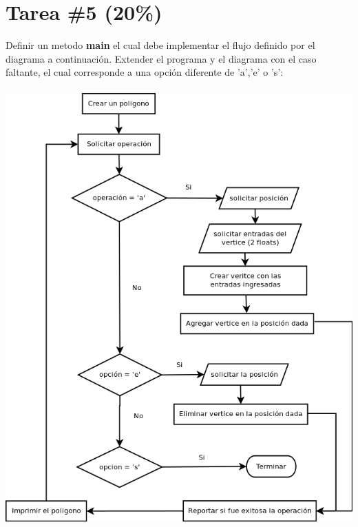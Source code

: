 \documentclass{article}
\begin{document}
\section*{Tarea \#5 (20\%)}

Definir un metodo {\bf main} el cual debe implementar el flujo definido por
el diagrama a continuaci\'on. Extender el programa y el diagrama con el caso
faltante, el cual corresponde a una opci\'on diferente de 'a','e' o 's':
\\\\
\includegraphics[width=15cm]{flujo.png}
\end{document}
